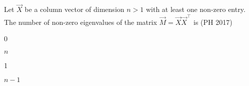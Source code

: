 \item Let $\vec{X}$ be a column vector of dimension $n>1$ with at least one non-zero entry. The number of non-zero eigenvalues of the matrix $\vec{M}=\vec{X}\vec{X}^{\top}$ is
\hfill {(PH 2017)}
\begin{enumerate}
\begin{multicols}{4}
\item 0
\item $n$
\item 1
\item $n-1$
\end{multicols}
\end{enumerate}

